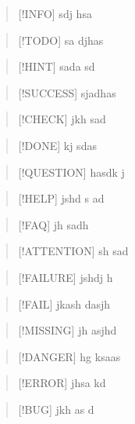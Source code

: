 \documentclass[
]{article}
\begin{document}
\begin{quote}
{[}!INFO{]} sdj hsa
\end{quote}

\begin{quote}
{[}!TODO{]} sa djhas
\end{quote}

\begin{quote}
{[}!HINT{]} sada sd
\end{quote}

\begin{quote}
{[}!SUCCESS{]} sjadhas
\end{quote}

\begin{quote}
{[}!CHECK{]} jkh sad
\end{quote}

\begin{quote}
{[}!DONE{]} kj sdas
\end{quote}

\begin{quote}
{[}!QUESTION{]} hasdk j
\end{quote}

\begin{quote}
{[}!HELP{]} jshd s ad
\end{quote}

\begin{quote}
{[}!FAQ{]} jh sadh
\end{quote}

\begin{quote}
{[}!ATTENTION{]} sh sad
\end{quote}

\begin{quote}
{[}!FAILURE{]} jshdj h
\end{quote}

\begin{quote}
{[}!FAIL{]} jkash dasjh
\end{quote}

\begin{quote}
{[}!MISSING{]} jh asjhd
\end{quote}

\begin{quote}
{[}!DANGER{]} hg ksaas
\end{quote}

\begin{quote}
{[}!ERROR{]} jhsa kd
\end{quote}

\begin{quote}
{[}!BUG{]} jkh as d
\end{quote}
\end{document}
